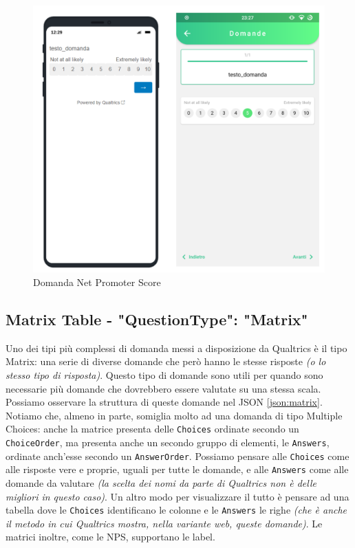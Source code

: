 \begin{figure}[ht!]
\centering
\includegraphics[width=\textwidth]{img/nps}
\caption{Domanda Net Promoter Score}
\label{fig:nps}
\end{figure}

\clearpage
\subsection{Matrix Table - "QuestionType": "Matrix"}
Uno dei tipi più complessi di domanda messi a disposizione da Qualtrics è il tipo Matrix: una serie di diverse domande che però hanno le stesse risposte \textit{(o lo stesso tipo di risposta)}. Questo tipo di domande sono utili per quando sono necessarie più domande che dovrebbero essere valutate su una stessa scala. Possiamo osservare la struttura di queste domande nel JSON \ref{json:matrix}. Notiamo che, almeno in parte, somiglia molto ad una domanda di tipo Multiple Choices: anche la matrice presenta delle \texttt{Choices} ordinate secondo un \texttt{ChoiceOrder}, ma presenta anche un secondo gruppo di elementi, le \texttt{Answers}, ordinate anch'esse secondo un \texttt{AnswerOrder}.
Possiamo pensare alle \texttt{Choices} come alle risposte vere e proprie, uguali per tutte le domande, e alle \texttt{Answers} come alle domande da valutare \textit{(la scelta dei nomi da parte di Qualtrics non è delle migliori in questo caso)}. Un altro modo per visualizzare il tutto è pensare ad una tabella	dove le \texttt{Choices} identificano le colonne e le \texttt{Answers} le righe \textit{(che è anche il metodo in cui Qualtrics mostra, nella variante web, queste domande)}. Le matrici inoltre, come le NPS, supportano le label.

